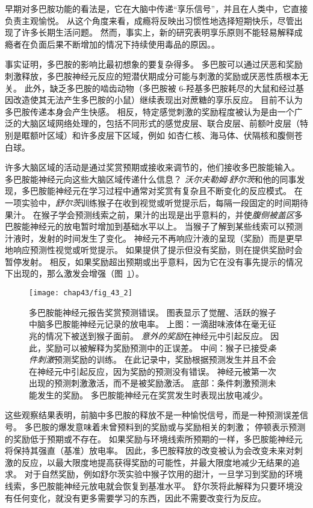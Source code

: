 早期对多巴胺功能的看法是，它在大脑中传递“享乐信号”，并且在人类中，它直接负责主观愉悦。
从这个角度来看，成瘾将反映出习惯性地选择短期快乐，尽管出现了许多长期生活问题。
然而，事实上，新的研究表明享乐原则不能轻易解释成瘾者在负面后果不断增加的情况下持续使用毒品的原因。。


事实证明，多巴胺的影响比最初想象的要复杂得多。
多巴胺可以通过厌恶和奖励刺激释放，多巴胺神经元反应的短潜伏期成分可能与刺激的奖励或厌恶性质根本无关。
此外，缺乏多巴胺的啮齿动物（多巴胺被 6-羟基多巴胺耗尽的大鼠和经过基因改造使其无法产生多巴胺的小鼠）继续表现出对蔗糖的享乐反应。
目前不认为多巴胺传递本身会产生快感。
相反，特定感觉刺激的奖励程度被认为是由一个广泛的大脑区域网络处理的，包括不同形式的感觉皮层、联合皮层、前额叶皮层（特别是眶额叶区域）和许多皮层下区域，例如 如杏仁核、海马体、伏隔核和腹侧苍白球。


许多大脑区域的活动是通过奖赏预期或接收来调节的，他们接收多巴胺能输入。
多巴胺能神经元向这些大脑区域传递什么信息？
\textit{沃尔夫勒姆$\cdot$舒尔茨}和他的同事发现，多巴胺能神经元在学习过程中通常对奖赏有复杂且不断变化的反应模式。
在一项实验中，\textit{舒尔茨}训练猴子在收到视觉或听觉提示后，每隔一段固定的时间期待果汁。
在猴子学会预测线索之前，果汁的出现是出乎意料的，并使\textit{腹侧被盖区}多巴胺能神经元的放电暂时增加到基础水平以上。
当猴子了解到某些线索可以预测汁液时，发射的时间发生了变化。
神经元不再响应汁液的呈现（奖励）而是更早地响应预测性视觉或听觉提示。
如果提供了提示但没有奖励，则在提供奖励时会暂停发射。
相反，如果奖励超出预期或出乎意料，因为它在没有事先提示的情况下出现的，那么激发会增强（图~\ref{fig:43_2}）。


\begin{figure}[htbp]
	\centering
	\texttt{[image: chap43/fig\_43\_2]}
	\caption{多巴胺能神经元报告奖赏预测错误。
		图表显示了觉醒、活跃的猴子中脑多巴胺能神经元记录的放电率。
		上图：一滴甜味液体在毫无征兆的情况下被送到猴子面前。
		\textit{意外的奖励}在神经元中引起反应。
		因此，奖励可以被解释为奖励预测中的正误差。
		中间：猴子已接受\textit{条件刺激}预测奖励的训练。
		在此记录中，奖励根据预测发生并且不会在神经元中引起反应，因为奖励的预测没有错误。
		神经元被第一次出现的预测刺激激活，而不是被奖励激活。
		底部：条件刺激预测未能发生的奖励。
		多巴胺能神经元在奖赏发生时表现出放电减少\cite{schultz1997neural}。}
	\label{fig:43_2}
\end{figure}


这些观察结果表明，前脑中多巴胺的释放不是一种愉悦信号，而是一种预测误差信号。
多巴胺的爆发意味着未曾预料到的奖励或与奖励相关的刺激；
停顿表示预测的奖励低于预期或不存在。
如果奖励与环境线索所预期的一样，多巴胺能神经元将保持其强直（基准）放电率。
因此，多巴胺释放的改变被认为会改变未来对刺激的反应，以最大限度地提高获得奖励的可能性，并最大限度地减少无结果的追求。
对于自然奖励，例如舒尔茨实验中猴子饮用的甜汁，一旦学习到奖励的环境线索，多巴胺能神经元放电就会恢复到基准水平。
舒尔茨将此解释为只要环境没有任何变化，就没有更多需要学习的东西，因此不需要改变行为反应。


